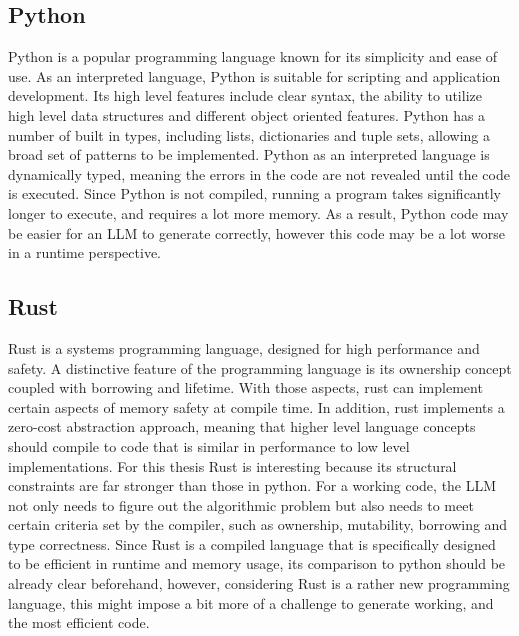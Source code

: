 \documentclass[12pt,a4paper]{report}
\begin{document}
\subsection{Python}
Python is a popular programming language known for its simplicity and ease of use. As an interpreted language, Python is suitable for scripting and application development. Its high level features include clear syntax, the ability to utilize high level data structures and different object oriented features. Python has a number of built in types, including lists, dictionaries and tuple sets, allowing a broad set of patterns to be implemented. Python as an interpreted language is dynamically typed, meaning the errors in the code are not revealed until the code is executed. Since Python is not compiled, running a program takes significantly longer to execute, and requires a lot more memory. As a result, Python code may be easier for an LLM to generate correctly, however this code may be a lot worse in a runtime perspective.
\subsection{Rust}
Rust is a systems programming language, designed for high performance and safety. A distinctive feature of the programming language is its ownership concept coupled with borrowing and lifetime. With those aspects, rust can implement certain aspects of memory safety at compile time. In addition, rust implements a zero-cost abstraction approach, meaning that higher level language concepts should compile to code that is similar in performance to low level implementations. For this thesis Rust is interesting because its structural constraints are far stronger than those in python. For a working code, the LLM not only needs to figure out the algorithmic problem but also needs to meet certain criteria set by the compiler, such as ownership, mutability, borrowing and type correctness. Since Rust is a compiled language that is specifically designed to be efficient in runtime and memory usage, its comparison to python should be already clear beforehand, however, considering Rust is a rather new programming language, this might impose a bit more of a challenge to generate working, and the most efficient code.
\end{document}
